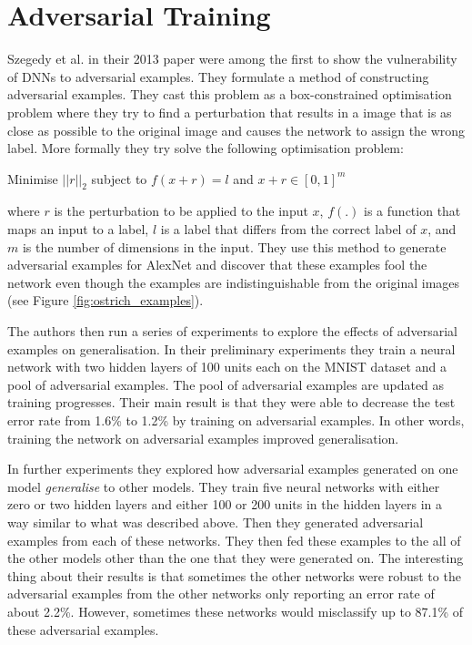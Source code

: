 \documentclass{article}
\begin{document}
\section{Adversarial Training}
Szegedy et al. in their 2013 paper \cite{szegedy2013intriguing} were among the first to show the vulnerability of DNNs to adversarial examples. They formulate a method of constructing adversarial examples. They cast this problem as a box-constrained optimisation problem where they try to find a perturbation that results in a image that is as close as possible to the original image and causes the network to assign the wrong label. More formally they try solve the following optimisation problem:
\begin{center}
    Minimise $||r||_2$ subject to $f(x + r) = l$ and $x + r \in [0, 1]^m$
\end{center}
where $r$ is the perturbation to be applied to the input $x$, $f(.)$ is a function that maps an input to a label, $l$ is a label that differs from the correct label of $x$, and $m$ is the number of dimensions in the input. They use this method to generate adversarial examples for AlexNet and discover that these examples fool the network even though the examples are indistinguishable from the original images (see Figure \ref{fig:ostrich_examples}).

The authors then run a series of experiments to explore the effects of adversarial examples on generalisation. In their preliminary experiments they train a neural network with two hidden layers of 100 units each on the MNIST dataset and a pool of adversarial examples. The pool of adversarial examples are updated as training progresses. Their main result is that they were able to decrease the test error rate from 1.6\% to 1.2\% by training on adversarial examples. In other words, training the network on adversarial examples improved generalisation. 

In further experiments they explored how adversarial examples generated on one model \textit{generalise} to other models. They train five neural networks with either zero or two hidden layers and either 100 or 200 units in the hidden layers in a way similar to what was described above. Then they generated adversarial examples from each of these networks. They then fed these examples to the all of the other models other than the one that they were generated on. The interesting thing about their results is that sometimes the other networks were robust to the adversarial examples from the other networks only reporting an error rate of about 2.2\%. However, sometimes these networks would misclassify up to 87.1\% of these adversarial examples.
\end{document}
